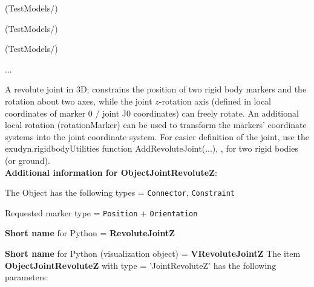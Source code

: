 \item {} (TestModels/)
\item {} (TestModels/)
\item {} (TestModels/)
\item  ...

\ei

%
\newpage

\label{sec:item:ObjectJointRevoluteZ}
A revolute joint in 3D; constrains the position of two rigid body markers and the rotation about two axes, while the joint $z$-rotation axis (defined in local coordinates of marker 0 / joint J0 coordinates) can freely rotate. An additional local rotation (rotationMarker) can be used to transform the markers' coordinate systems into the joint coordinate system. For easier definition of the joint, use the exudyn.rigidbodyUtilities function AddRevoluteJoint(...), , for two rigid bodies (or ground). \vspace{12pt}
 \\{\bf Additional information for ObjectJointRevoluteZ}:
\bi
  \item The Object has the following types = \texttt{Connector}, \texttt{Constraint}
  \item Requested marker type = \texttt{Position} + \texttt{Orientation}
  \item {\bf Short name} for Python = {\bf RevoluteJointZ}  \item {\bf Short name} for Python (visualization object) = {\bf VRevoluteJointZ}\ei
\vspace{12pt} \noindent The item {\bf ObjectJointRevoluteZ} with type = 'JointRevoluteZ' has the following parameters:\vspace{-1cm}\\ 
